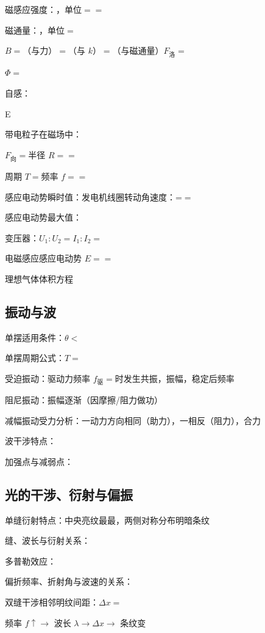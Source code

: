 磁感应强度：\sbl ，单位\sbl $=$\sbl $=$\sbl

磁通量：\sbl ，单位\sbl $=$\sbl

$B=$\sbl （与力）$=$\sbl （与 $k$）$=$\sbl （与磁通量）$F_{\text{洛}}=$\sbl

$\Phi=$\sbl

自感：

E \elb

带电粒子在磁场中：

$F_{\text{向}}=$\sbl \quad 半径 $R=$\sbl $=$\sbl

周期 $T=$\sbl \quad 频率 $f=$\sbl $=$\sbl


感应电动势瞬时值：\sbl \emb \quad 发电机线圈转动角速度：\sbl =\sbl $=$\sbl

感应电动势最大值：\sbl \emb

变压器：$U_1 : U_2 =$\sbl \quad $I_1 : I_2 =$\sbl

电磁感应感应电动势 $E=$\sbl $=$\sbl

理想气体体积方程\clb

\subsection{振动与波}

单摆适用条件：$\theta <$\sbl

单摆周期公式：$T=$\mbl

受迫振动：驱动力频率 $f_{\text{驱}} =$\sbl 时发生共振，振幅\sbl ，稳定后频率 \esb

阻尼振动：振幅逐渐\sbl （因摩擦/阻力做功）

减幅振动受力分析：一动力方向相同（助力），一相反（阻力），合力\sbl

波干涉特点：

加强点与减弱点：

\subsection{光的干涉、衍射与偏振}

单缝衍射特点：中央亮纹最\sbl 最\sbl ，两侧对称分布明暗条纹

缝、波长与衍射关系：

多普勒效应：

偏折频率、折射角与波速的关系：

双缝干涉相邻明纹间距：$\Delta x =$\mbl

频率 $f \uparrow \rightarrow$ 波长 $\lambda $\sbl $\rightarrow \Delta x $\sbl $\rightarrow$ 条纹变\sbl

